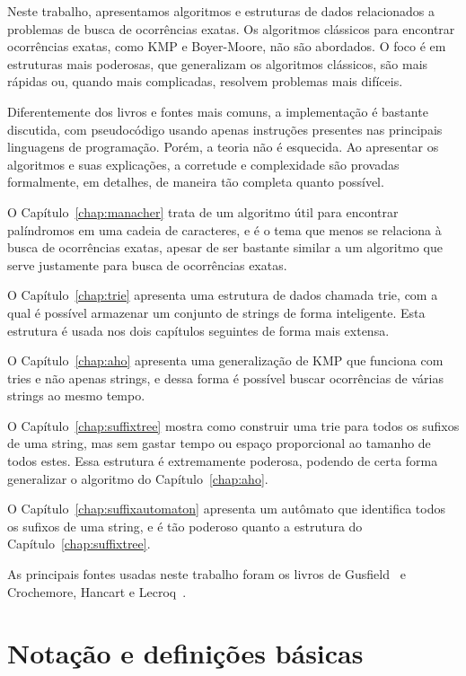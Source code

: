 \documentclass[11pt,oneside,a4paper, openany]{book}
\begin{document}
Neste trabalho, apresentamos algoritmos e estruturas de dados relacionados a problemas de busca de ocorrências exatas. Os algoritmos clássicos para encontrar ocorrências exatas, como KMP e Boyer-Moore, não são abordados. O foco é em estruturas mais poderosas, que generalizam os algoritmos clássicos, são mais rápidas ou, quando mais complicadas, resolvem problemas mais difíceis.

Diferentemente dos livros e fontes mais comuns, a implementação é bastante discutida, com pseudocódigo usando apenas instruções presentes nas principais linguagens de programação. Porém, a teoria não é esquecida. Ao apresentar os algoritmos e suas explicações, a corretude e complexidade são provadas formalmente, em detalhes, de maneira tão completa quanto possível.

O Capítulo~\ref{chap:manacher} trata de um algoritmo útil para encontrar palíndromos em uma cadeia de caracteres, e é o tema que menos se relaciona à busca de ocorrências exatas, apesar de ser bastante similar a um algoritmo que serve justamente para busca de ocorrências exatas.

O Capítulo~\ref{chap:trie} apresenta uma estrutura de dados chamada trie, com a qual é possível armazenar um conjunto de strings de forma inteligente. Esta estrutura é usada nos dois capítulos seguintes de forma mais extensa.

O Capítulo~\ref{chap:aho} apresenta uma generalização de KMP que funciona com tries e não apenas strings, e dessa forma é possível buscar ocorrências de várias strings ao mesmo tempo.

O Capítulo~\ref{chap:suffixtree} mostra como construir uma trie para todos os sufixos de uma string, mas sem gastar tempo ou espaço proporcional ao tamanho de todos estes. Essa estrutura é extremamente poderosa, podendo de certa forma generalizar o algoritmo do Capítulo~\ref{chap:aho}.

O Capítulo~\ref{chap:suffixautomaton} apresenta um autômato que identifica todos os sufixos de uma string, e é tão poderoso quanto a estrutura do Capítulo~\ref{chap:suffixtree}.

As principais fontes usadas neste trabalho foram os livros de Gusfield~\cite{gusfield} e Crochemore, Hancart e Lecroq~\cite{crochemore}.

\section{Notação e definições básicas}
\end{document}
